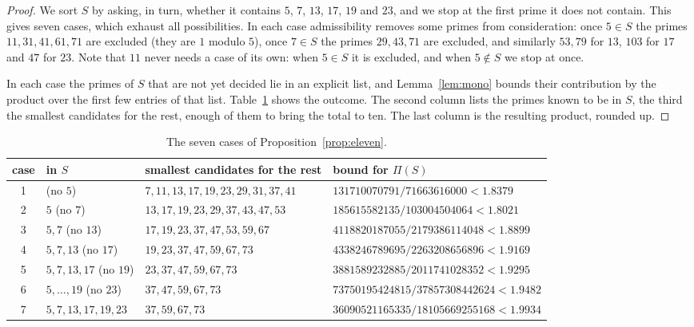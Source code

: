 \documentclass[11pt]{amsart}
\theoremstyle{definition}
\theoremstyle{remark}
\begin{document}
\begin{proof}
We sort $S$ by asking, in turn, whether it contains $5$, $7$, $13$, $17$,
$19$ and $23$, and we stop at the first prime it does not contain. This
gives seven cases, which exhaust all possibilities. In each case
admissibility removes some primes from consideration: once $5\in S$ the
primes $11,31,41,61,71$ are excluded (they are $1$ modulo $5$), once
$7\in S$ the primes $29,43,71$ are excluded, and similarly $53,79$ for
$13$, $103$ for $17$ and $47$ for $23$. Note that $11$ never needs a case
of its own: when $5\in S$ it is excluded, and when $5\notin S$ we stop
at once.

In each case the primes of $S$ that are not yet decided lie in an
explicit list, and Lemma~\ref{lem:mono} bounds their contribution by the
product over the first few entries of that list. Table~\ref{tab:cases}
shows the outcome. The second column lists the primes known to be in
$S$, the third the smallest candidates for the rest, enough of them to
bring the total to ten. The last column is the resulting product,
rounded up.
\end{proof}

\begin{table}[ht]
\centering
\caption{The seven cases of Proposition~\ref{prop:eleven}.}
\label{tab:cases}
\smallskip
\small
\begin{tabular}{@{}clll@{}}
\toprule
case & in $S$ & smallest candidates for the rest & bound for $\Pi(S)$ \\
\midrule
1 & (no $5$) & $7,11,13,17,19,23,29,31,37,41$ & $131710070791/71663616000<1.8379$\\
2 & $5$ (no $7$) & $13,17,19,23,29,37,43,47,53$ & $185615582135/103004504064<1.8021$\\
3 & $5,7$ (no $13$) & $17,19,23,37,47,53,59,67$ & $4118820187055/2179386114048<1.8899$\\
4 & $5,7,13$ (no $17$) & $19,23,37,47,59,67,73$ & $4338246789695/2263208656896<1.9169$\\
5 & $5,7,13,17$ (no $19$) & $23,37,47,59,67,73$ & $3881589232885/2011741028352<1.9295$\\
6 & $5,\dots,19$ (no $23$) & $37,47,59,67,73$ & $73750195424815/37857308442624<1.9482$\\
7 & $5,7,13,17,19,23$ & $37,59,67,73$ & $36090521165335/18105669255168<1.9934$\\
\bottomrule
\end{tabular}
\end{table}
\end{document}
